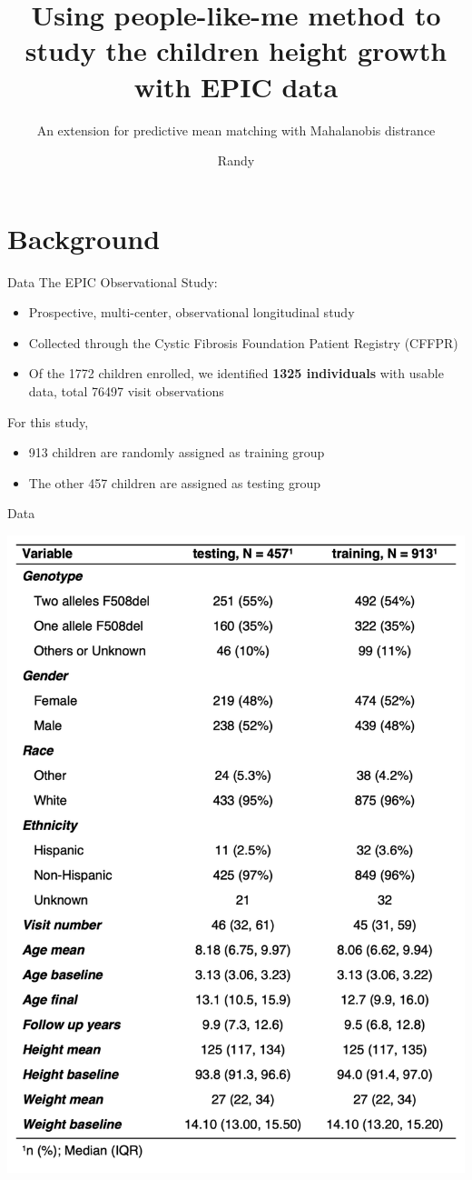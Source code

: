 \documentclass[
  8pt,
  ignorenonframetext,
]{beamer}
\title{Using people-like-me method to study the children height growth
with EPIC data}
\subtitle{An extension for predictive mean matching with Mahalanobis
distrance}
\author{Randy}
\date{}
\institute{Department of Biostatistics \& Informatics}
\providecommand{\tightlist}{%
  \setlength{\itemsep}{0pt}\setlength{\parskip}{0pt}}
\begin{document}
\frame{\titlepage}

\begin{frame}[allowframebreaks]
  \tableofcontents[hideallsubsections]
\end{frame}
\hypertarget{background}{%
\section{Background}\label{background}}

\begin{frame}{Data}
\protect\hypertarget{data}{}
The EPIC Observational Study:

\begin{itemize}
\tightlist
\item
  Prospective, multi-center, observational longitudinal study
\item
  Collected through the Cystic Fibrosis Foundation Patient Registry
  (CFFPR)
\item
  Of the 1772 children enrolled, we identified \textbf{1325 individuals}
  with usable data, total 76497 visit observations
\end{itemize}

For this study,

\begin{itemize}
\tightlist
\item
  913 children are randomly assigned as training group
\item
  The other 457 children are assigned as testing group
\end{itemize}
\end{frame}

\begin{frame}{Data}
\protect\hypertarget{data-1}{}
\begin{center}\includegraphics[width=0.5\linewidth]{figure/01_table1} \end{center}
\end{frame}
\end{document}
